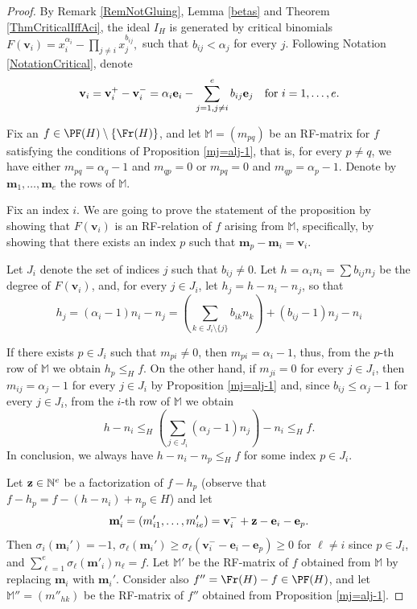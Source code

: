 \documentclass[11pt,twoside]{amsart}
\newcommand{\N}{\mathbb N}
\newcommand{\MM}{\mathbb M}
\def\bv{{\mathbf v}}
\def\be{{\mathbf e}}
\def\bm{{\mathbf m}}
\def\bbM{{\mathbb M}}
\def\al{\alpha}
\theoremstyle{definition}
\numberwithin{equation}{section}
\begin{document}
\begin{proof}
By Remark \ref{RemNotGluing}, Lemma \ref{betas} and Theorem \ref{ThmCriticalIffAci}, the  ideal
 $I_H$ is generated by critical binomials   $F(\bv_i) = x_i^{\alpha_i}-\prod_{j \ne i} x_j^{b_{ij}},$ such that  $b_{ij} < \alpha_j$ for every $j$.  
Following Notation \ref{NotationCritical},
denote
$$\bv_i = \bv_i^+-\bv_i^-  = \al_i{\bf e}_i-\sum_{j=1, j\ne i}^e b_{ij}{\bf e}_j
\quad \text{for }i = 1, \ldots, e.$$ 


Fix an $f \in \PF(H) \setminus \{\Fr(H)\}$, and let 
$\mathbb{M} = (m_{pq})$ be an RF-matrix for $f$ satisfying the conditions of 
Proposition \ref{mj=alj-1}, that is,  for every $p\ne q$, we have  either $m_{pq}=\alpha_q-1$ and $m_{qp}=0$ or $m_{pq}=0$ and $m_{qp}=\alpha_p-1$. Denote by $\bm_1,\ldots,\bm_e$ the rows of $\bbM$.

Fix an index $i$. 
We are going to  prove the  statement of the proposition by showing that $F(\bv_i)$ is an RF-relation of $f$ arising from $\MM$, 
specifically,
by showing that there exists an index $p$ such that $\bm_p-\bm_i=\bv_i$. 


Let $J_i$ denote the set of indices $j$ such that $b_{ij} \ne 0$.
Let $h=\alpha_in_i=\sum b_{ij} n_j$ be the degree of $F(\bv_i)$, and, 
for every $j \in J_i$, let $h_j=h-n_i-n_j$, so that 
	\begin{equation}\label{fact}
		h_j=(\alpha_i-1)n_i - n_j = \left(\sum_{k \in J_i \setminus\{j\}} b_{ik}n_k \right) + (b_{ij}-1)n_j - n_i 
	\end{equation}


If there exists  $p \in J_i$ such that $m_{pi} \neq 0$, then $m_{pi} = \alpha_i-1$, thus, 
from the $p$-th row of $\mathbb{M}$ we obtain $h_p \le_H f$. 
On the other hand, if $m_{ji}=0$ for every $j \in J_i$, 
then  $m_{ij}=\alpha_j-1$ for every $j \in J_i$ by Proposition \ref{mj=alj-1}  and, since $b_{ij} \le \alpha_j-1$ for every $j \in J_i$, from the $i$-th row of 
$\mathbb{M}$ we obtain
	$$h-n_i \le_H \left(\sum_{j \in J_i} (\alpha_j-1)n_j \right) - n_i \le_H f.$$
In conclusion, we always have $h - n_i - n_p \le_H f$ for some index $p \in J_i$. 


Let 
 ${\bf z}\in \N^e$ be a factorization of $f- h_p$
(observe that $f- h_p = f-(h-n_i)+n_p \in H$) and let 
$$\bm_i'=(m'_{i1},\ldots,m'_{ie})=\bv_i^-+{\bf z}-\be_i-\be_p.$$
Then  $\sigma_i(\bm_i')=-1$,  $\sigma_\ell(\bm_i')\geq \sigma_\ell(\bv_i^--\be_i-\be_p) \ge 0$ for $\ell \ne i$ since $p \in J_i$,
 and $\sum_{\ell=1}^e \sigma_\ell(\bm'_i)n_\ell = f$. 
Let $\bbM'$ be 
 the RF-matrix  of $f$ obtained from $\bbM$ by replacing $\bm_i$ with $\bm_i'$. 
Consider also  $f'' = \Fr(H)-f \in \PF(H)$, and let $\bbM''=(m''_{hk})$ be the RF-matrix of $f''$ obtained from Proposition \ref{mj=alj-1}. 


\end{proof}
\end{document}
